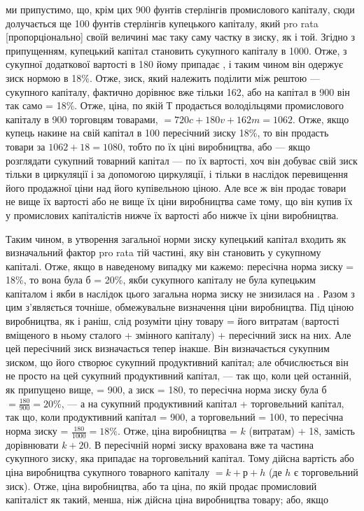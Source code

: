 \parcont{}  %
ми припустимо, що, крім цих 900 фунтів стерлінгів промислового
капіталу, сюди долучається ще 100 фунтів стерлінгів купецького
капіталу, який pro rata [пропорціонально] своїй величині має
таку саму частку в зиску, як і той. Згідно з припущенням,
купецький капітал становить  сукупного капіталу в 1000.
Отже, з сукупної додаткової вартості в 180 йому припадає ,
і таким чином він одержує зиск нормою в 18\%. Отже, зиск,
який належить поділити між рештою —  сукупного капіталу,
фактично дорівнює вже тільки 162, або на капітал в 900 він так
само = 18\%. Отже, ціна, по якій $Т$ продається володільцями промислового
капіталу в 900 торговцям товарами, $= 720c + 180v + 162m = 1062$.
Отже, якщо купець накине на свій капітал
в 100 пересічний зиску 18\%, то він продасть товари за $1062 + 18 = 1080$,
тобто по їх ціні виробництва, або — якщо розглядати
сукупний товарний капітал — по їх вартості, хоч він добуває
свій зиск тільки в циркуляції і за допомогою циркуляції, і тільки
в наслідок перевищення його продажної ціни над його купівельною
ціною. Але все ж він продає товари не вище їх вартості
або не вище їх ціни виробництва саме тому, що він купив їх
у промислових капіталістів нижче їх вартості або нижче їх ціни
виробництва.

Таким чином, в утворення загальної норми зиску купецький
капітал входить як визначальний фактор pro rata тій частині,
яку він становить у сукупному капіталі. Отже, якщо в наведеному
випадку ми кажемо: пересічна норма зиску = 18\%, то вона
була б = 20\%, якби  сукупного капіталу не була купецьким
капіталом і якби в наслідок цього загальна норма зиску не знизилася
на . Разом з цим з’являється точніше, обмежувальне визначення
ціни виробництва. Під ціною виробництва, як і раніш,
слід розуміти ціну товару = його витратам (вартості вміщеного
в ньому сталого + змінного капіталу) + пересічний зиск на них.
Але цей пересічний зиск визначається тепер інакше. Він визначається
сукупним зиском, що його створює сукупний продуктивний
капітал; але обчислюється він не просто на цей сукупний
продуктивний капітал, — так що, коли цей останній, як
припущено вище, = 900, а зиск = 180, то пересічна норма зиску
була б $= \frac{180}{900} = 20\%$, — а на сукупний продуктивний капітал + торговельний
капітал, так що, коли продуктивний капітал = 900, а торговельний = 100, то пересічна норма зиску =
$\frac{180}{1000} = 18\%$.
Отже, ціна виробництва = $k$ (витратам) + 18, замість дорівнювати
$k + 20$. В пересічній нормі зиску врахована вже та частина
сукупного зиску, яка припадає на торговельний капітал. Тому
дійсна вартість або ціна виробництва сукупного товарного капіталу
$= k + р + h$ (де $h$ є торговельний зиск). Отже, ціна виробництва,
або та ціна, по якій продає промисловий капіталіст як
такий, менша, ніж дійсна ціна виробництва товару; або, якщо
\parbreak{}  %
